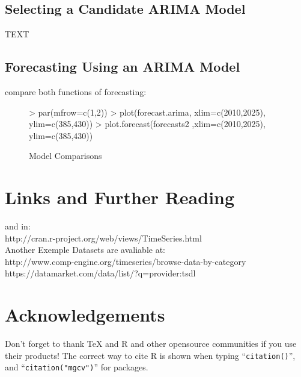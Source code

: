 \documentclass[11pt, a4paper]{article} %
\begin{document}
\subsection{Selecting a Candidate ARIMA Model}%

TEXT

\subsection{Forecasting Using an ARIMA Model}%

compare both functions of forecasting: 
\begin{figure}[H]
\centering
\begin{Schunk}
\begin{Sinput}
> par(mfrow=c(1,2))
> plot(forecast.arima, xlim=c(2010,2025), ylim=c(385,430))
> plot.forecast(forecasts2 ,xlim=c(2010,2025), ylim=c(385,430))
\end{Sinput}
\end{Schunk}
\caption{Model Comparisons}
\end{figure}



\section{Links and Further Reading}%

and in:\\

http://cran.r-project.org/web/views/TimeSeries.html\\

Another Exemple Datasets are avaliable at:\\

http://www.comp-engine.org/timeseries/browse-data-by-category\\
https://datamarket.com/data/list/?q=provider:tsdl\\

\section{Acknowledgements}%
Don't forget to thank TeX and R and other opensource communities if you use their products! The correct way to cite R is shown when typing ``\texttt{citation()}'', and ``\texttt{citation("mgcv")}'' for packages.

\clearpage
\end{document}
